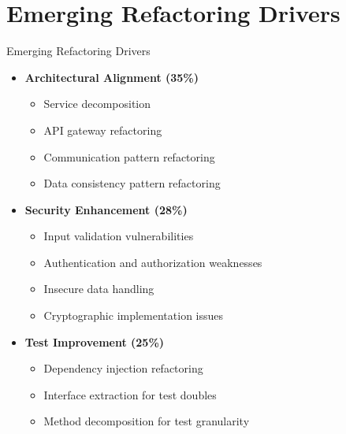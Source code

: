 \documentclass{beamer}
\begin{document}
\section{Emerging Refactoring Drivers}
\begin{frame}{Emerging Refactoring Drivers}
    \begin{itemize}
        \item \textbf{Architectural Alignment (35\%)}
            \begin{itemize}
                \item Service decomposition
                \item API gateway refactoring
                \item Communication pattern refactoring
                \item Data consistency pattern refactoring
            \end{itemize}
        \item \textbf{Security Enhancement (28\%)}
            \begin{itemize}
                \item Input validation vulnerabilities
                \item Authentication and authorization weaknesses
                \item Insecure data handling
                \item Cryptographic implementation issues
            \end{itemize}
        \item \textbf{Test Improvement (25\%)}
            \begin{itemize}
                \item Dependency injection refactoring
                \item Interface extraction for test doubles
                \item Method decomposition for test granularity
            \end{itemize}
    \end{itemize}
\end{frame}

\end{document}
